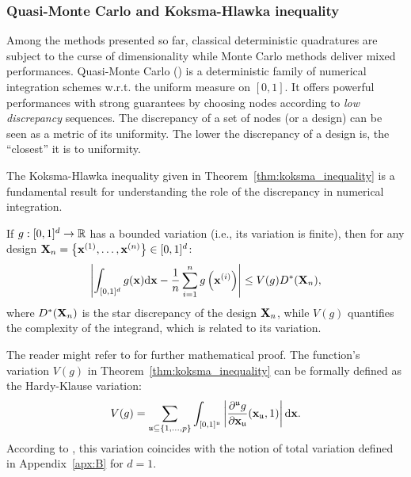 \subsubsection{Quasi-Monte Carlo and Koksma-Hlawka inequality}\label{sec:1qmc}

Among the methods presented so far, classical deterministic quadratures are subject to the curse of dimensionality while Monte Carlo methods deliver mixed performances. 
Quasi-Monte Carlo () is a deterministic family of numerical integration schemes w.r.t. the uniform measure on $[0, 1]$. 
It offers powerful performances with strong guarantees by choosing nodes according to \textit{low discrepancy} sequences. 
The discrepancy of a set of nodes (or a design) can be seen as a metric of its uniformity. 
The lower the discrepancy of a design is, the ``closest'' it is to uniformity. 

The Koksma-Hlawka inequality given in Theorem~\ref{thm:koksma_inequality} \citep{morokoff_1995,leobacher_2014} is a fundamental result for understanding the role of the discrepancy in numerical integration. 
\begin{theorem}\label{thm:koksma_inequality}
    If $g:[0, 1]^d\rightarrow\mathbb{R}$ has a bounded variation (i.e., its variation is finite), then for any design ${\bf X}_n = \left\{{\bf x}^{(1)}, \dots, {\bf x}^{(n)}\right\} \in [0, 1]^d$:
    \begin{equation}
        \left| \int_{[0, 1]^d} g({\bf x}) \mathrm{d}{\bf x} - \frac1n \sum_{i=1}^n g\left({\bf x}^{(i)}\right)\right| \leq  V(g) D^*({\bf X}_n),
    \end{equation}
    where $D^*({\bf X}_n)$ is the star discrepancy of the design ${\bf X}_n$, while $V(g)$ quantifies the complexity of the integrand, which is related to its variation. 
\end{theorem}

The reader might refer to \citet[Sec. 3.4]{leobacher_2014} for further mathematical proof.
The function's variation $V(g)$ in Theorem~\ref{thm:koksma_inequality} can be formally defined as the Hardy-Klause variation: 
\begin{equation}
    V(g) = \sum_{\mathfrak{u}\subseteq\{1, \dots, p \}} \int_{[0, 1]^\mathfrak{u}} \left| \frac{\partial^{\mathfrak{u}}g}{\partial {\bf x}_{\mathfrak{u}}}({\bf x}_{\mathfrak{u}}, 1)\right| \mathrm{d}{\bf x}.
\end{equation}
According to \citealp[p.188]{sullivan_2015}, this variation coincides with the notion of total variation defined in Appendix~\ref{apx:B} for $d=1$.

